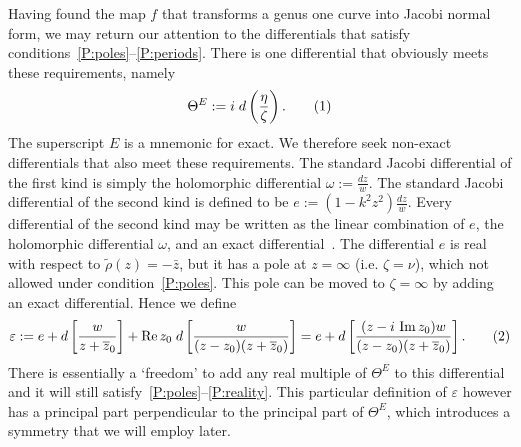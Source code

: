 \documentclass{article}
\begin{document}
Having found the map $f$ that transforms a genus one curve into Jacobi normal form, we may return our attention to the differentials that satisfy conditions~\ref{P:poles}--\ref{P:periods}.
There is one differential that obviously meets these requirements, namely
\[
\Theta^E := \iu\; d\left( \frac{\eta}{\zeta} \right).
\labelthis{eqn:thetaE}
\]
The superscript $E$ is a mnemonic for exact. We therefore seek non-exact differentials that also meet these requirements.
The standard Jacobi differential of the first kind is simply the holomorphic differential $\omega := \tfrac{dz}{w}$.
The standard Jacobi differential of the second kind is defined to be
$e := (1-k^2 z^2) \tfrac{dz}{w}$.
Every differential of the second kind may be written as the linear combination of $e$, the holomorphic differential $\omega$, and an exact differential~\cite[Art. 167]{Hancock1910}.
The differential $e$ is real with respect to $\tilde{\rho}(z) = -\bar{z}$, but it has a pole at $z=\infty$ (i.e. $\zeta=\nu$), which not allowed under condition~\ref{P:poles}. This pole can be moved to $\zeta=\infty$ by adding an exact differential. Hence we define 
\[
\varepsilon := e + d\left[ \frac{w}{z + \bar{z}_0} \right] + \Real z_0\; d\left[ \frac{w}{(z-z_0)(z + \bar{z}_0)} \right]
= e + d\left[ \frac{(z - \iu\,\Imag z_0)w}{(z-z_0)(z + \bar{z}_0)} \right].
\labelthis{eqn:def_varepsilon}
\]
There is essentially a `freedom' to add any real multiple of $\Theta^E$ to this differential and it will still satisfy~\ref{P:poles}--\ref{P:reality}. This particular definition of $\varepsilon$ however has a principal part perpendicular to the principal part of $\Theta^E$, which introduces a symmetry that we will employ later.
\end{document}
